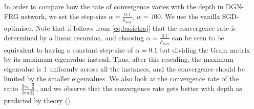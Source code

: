 In order to compare how the rate of convergence varies with the depth in DGN-FRG network, we set the step-size $\alpha=\frac{0.1}{\rho_{\max}}$, $w=100$. We use the vanilla SGD-optimiser. Note that if follows from \eqref{eq:basictraj} that the convergence rate is determined by a linear recursion, and choosing $\alpha=\frac{0.1}{\rho_{\max}}$ can be seen to be equivalent to having a constant step-size of $\alpha=0.1$ but dividing the Gram matrix by its maximum eigenvalue instead. Thus, after this rescaling, the maximum eigenvalue is $1$ uniformly across all the instances, and the convergence should be limited by the smaller eigenvalues. We also look at the convergence rate of the ratio $\frac{\|e_t\|^2_2}{\|e_0\|^2_2}$, and we observe that the convergence rate gets better with depth as predicted by theory ().


